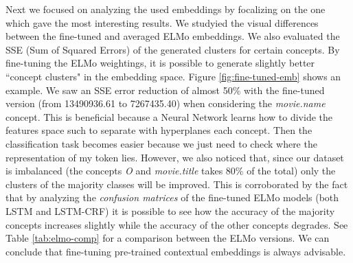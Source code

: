 \documentclass[11pt,a4paper]{article}
\begin{document}
Next we focused on analyzing the used embeddings by focalizing on the one which gave the most interesting results. We studyied the visual differences between the fine-tuned and averaged ELMo embeddings. We also evaluated the SSE (Sum of Squared Errors) of the generated clusters for certain concepts. By fine-tuning the ELMo weightings, it is possible to generate slightly better ``concept clusters" in the embedding space. Figure \ref{fig:fine-tuned-emb} shows an example. We saw an SSE error reduction of almost 50\% with the fine-tuned version (from 13490936.61 to 7267435.40) when considering the \textit{movie.name} concept. This is beneficial because a Neural Network learns how to divide the features space such to separate with hyperplanes each concept. Then the classification task becomes easier because we just need to check where the representation of my token lies.  However, we also noticed that, since our dataset is imbalanced (the concepts \textit{O} and \textit{movie.title} takes 80\% of the total) only the clusters of the majority classes will be improved. This is corroborated by the fact that by analyzing the \textit{confusion matrices} of the fine-tuned ELMo models (both LSTM and LSTM-CRF) it is possible to see how the accuracy of the majority concepts increases slightly while the accuracy of the other concepts degrades. See Table \ref{tab:elmo-comp} for a comparison between the ELMo versions. We can conclude that fine-tuning pre-trained contextual embeddings is always advisable. 

\begin{table}[]
\centering
{}
\caption{Given the top-seven concepts from the test dataset, we compute the tagging accuracy when using the LSTM-CRF and the CHAR+POS+NER features. The first five concepts appear more than 2\% over the entire dataset, while the last two appear less than 1\%. It is possible to see how the performances increase for the first fìive when using the fine-tuned ELMo, while the other two accuracies decrease with respect to the averaged ELMo.}
\label{tab:elmo-comp}
\end{table}
\end{document}
